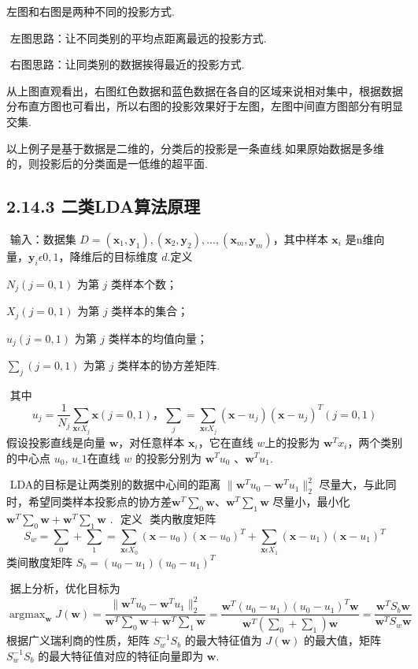 左图和右图是两种不同的投影方式.

​ 左图思路：让不同类别的平均点距离最远的投影方式.

​ 右图思路：让同类别的数据挨得最近的投影方式.

​
从上图直观看出，右图红色数据和蓝色数据在各自的区域来说相对集中，根据数据分布直方图也可看出，所以右图的投影效果好于左图，左图中间直方图部分有明显交集.

​
以上例子是基于数据是二维的，分类后的投影是一条直线.如果原始数据是多维的，则投影后的分类面是一低维的超平面.

\subsection{2.14.3
二类LDA算法原理}\label{ux4e8cux7c7bldaux7b97ux6cd5ux539fux7406}

​ 输入：数据集
$D={(\boldsymbol x_1,\boldsymbol y_1),(\boldsymbol x_2,\boldsymbol y_2),...,(\boldsymbol x_m,\boldsymbol y_m)}​$，其中样本
$\boldsymbol x_i ​$
是n维向量，$\boldsymbol y_i \epsilon {0, 1}​$，降维后的目标维度
$d​$.定义

​ $N_j(j=0,1)$ 为第 $j$ 类样本个数；

​ $X_j(j=0,1)$ 为第 $j$ 类样本的集合；

​ $u_j(j=0,1)​$ 为第 $j​$ 类样本的均值向量；

​ $\sum_j(j=0,1)$ 为第 $j$ 类样本的协方差矩阵.

​ 其中 \[
u_j = \frac{1}{N_j} \sum_{\boldsymbol x\epsilon X_j}\boldsymbol x(j=0,1)， 
\sum_j = \sum_{\boldsymbol x\epsilon X_j}(\boldsymbol x-u_j)(\boldsymbol x-u_j)^T(j=0,1)
\] ​ 假设投影直线是向量 $\boldsymbol w$，对任意样本
$\boldsymbol x_i$，它在直线 $w$上的投影为
$\boldsymbol w^Tx_i$，两个类别的中心点 $u_0$, $u\_1 $在直线 $w$
的投影分别为 $\boldsymbol w^Tu_0$ 、$\boldsymbol w^Tu_1$.

​ LDA的目标是让两类别的数据中心间的距离
$\| \boldsymbol w^Tu_0 - \boldsymbol w^Tu_1 \|^2_2$
尽量大，与此同时，希望同类样本投影点的协方差$\boldsymbol w^T \sum_0 \boldsymbol w$、$\boldsymbol w^T \sum_1 \boldsymbol w$
尽量小，最小化
$\boldsymbol w^T \sum_0 \boldsymbol w + \boldsymbol w^T \sum_1 \boldsymbol w​$
. ​ 定义 ​ 类内散度矩阵 \[
S_w = \sum_0 + \sum_1 = 
    \sum_{\boldsymbol x\epsilon X_0}(\boldsymbol x-u_0)(\boldsymbol x-u_0)^T + 
    \sum_{\boldsymbol x\epsilon X_1}(\boldsymbol x-u_1)(\boldsymbol x-u_1)^T
\] ​ 类间散度矩阵 $S_b = (u_0 - u_1)(u_0 - u_1)^T$

​ 据上分析，优化目标为
\[
\mathop{\arg\max}_\boldsymbol w J(\boldsymbol w) = \frac{\| \boldsymbol w^Tu_0 - \boldsymbol w^Tu_1 \|^2_2}{\boldsymbol w^T \sum_0\boldsymbol w + \boldsymbol w^T \sum_1\boldsymbol w} = 
\frac{\boldsymbol w^T(u_0-u_1)(u_0-u_1)^T\boldsymbol w}{\boldsymbol w^T(\sum_0 + \sum_1)\boldsymbol w} =
\frac{\boldsymbol w^TS_b\boldsymbol w}{\boldsymbol w^TS_w\boldsymbol w}
\] ​ 根据广义瑞利商的性质，矩阵 $S^{-1}_{w} S_b$ 的最大特征值为
$J(\boldsymbol w)$ 的最大值，矩阵 $S^{-1}_{w} S_b$
的最大特征值对应的特征向量即为 $\boldsymbol w$.

